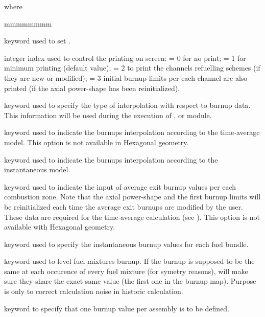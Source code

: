\noindent where
\begin{ListeDeDescription}{mmmmmmmm}

\item[\moc{EDIT}] keyword used to set .

\item[\dusa{iprint}] integer index used to control the printing on screen:
 = 0 for no print; = 1 for minimum printing (default value); = 2 to print the channels
refuelling schemes (if they are new or modified); = 3 initial burnup limits per each
channel are also printed (if the axial power-shape has been reinitialized).

\item[\moc{BTYPE}] keyword used to specify the type of interpolation with respect
to burnup data. This information will be used during the execution of ,
 or  module.

\item[\moc{TIMAV-BURN}]  keyword used to indicate the burnups interpolation
according to the time-average model. This option is not available in 
Hexagonal geometry.

\item[\moc{INST-BURN}] keyword used to indicate the burnups interpolation
according to the instantaneous model.

\item[\moc{TIMAV-BVAL}] keyword used to indicate the input of average exit burnup
values per each combustion zone. Note that the axial power-shape and the first burnup
limits will be reinitialized each time the average exit burnups are modified by the user.
These data are required for the time-average calculation (see ). This option
is not available with  Hexagonal geometry.

\item[\moc{INST-BVAL}] keyword used to specify the instantaneous burnup
values for each fuel bundle.

\item[\moc{SMOOTH}] keyword used to level fuel mixtures burnup. If the burnup is supposed 
to be the same at each occurence of every fuel mixture (for symetry reasons),  will
make sure they share the exact same value (the first one in the burnup map).
Purpose is only to correct calculation noise in historic calculation.

\item[\moc{ASBLY}] keyword to specify that one burnup value per assembly is to be defined.


\end{ListeDeDescription}
